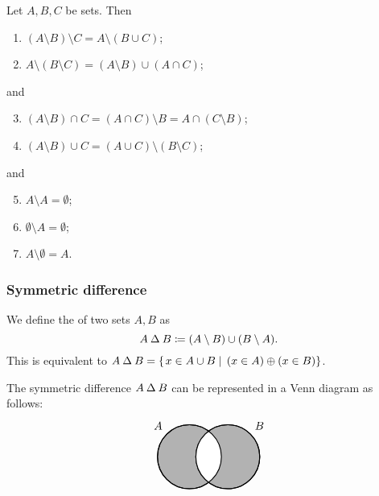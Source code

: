 \begin{lemma} \label{lemma:differenceProperties}
Let $A,B,C$ be sets. Then
\begin{enumerate}
\item $(A\setminus B)\setminus C = A\setminus (B\cup C)$;
\item $A\setminus (B\setminus C) = (A\setminus B) \cup (A\cap C)$;
\end{enumerate}
and
\begin{enumerate} \setcounter{enumi}{2}
\item $(A\setminus B)\cap C = (A\cap C)\setminus B = A\cap (C\setminus B)$;
\item $(A\setminus B)\cup C = (A\cup C)\setminus (B\setminus C)$;
\end{enumerate}
and
\begin{enumerate} \setcounter{enumi}{4}
\item $A\setminus A = \emptyset$;
\item $\emptyset\setminus A = \emptyset$;
\item $A\setminus \emptyset = A$.
\end{enumerate}
\end{lemma}

\subsubsection{Symmetric difference}
\begin{definition}
We define the  of two sets $A,B$ as
\[ A \mathbin{\Delta} B \coloneqq (A\setminus B)\cup(B\setminus A). \]
This is equivalent to $A\mathbin{\Delta} B = \left\{\left. x\in A\cup B \;\right|\; (x\in A)\oplus (x\in B) \right\}$.
\end{definition}

The symmetric difference $A\mathbin{\Delta} B$ can be represented in a Venn diagram as follows:
\[ \begin{tikzpicture}[thick,
    set/.style = {circle,
        minimum size = 2cm}]

\node[set,draw,fill=black!30,label={135:$A$}] (A) at (0,0) {};

\node[set,draw,fill=black!30,label={45:$B$}] (B) at (1.2,0) {};

\begin{scope}
    \clip (0,0) circle(1cm);
    \clip (1.2,0) circle(1cm);
    \fill[white](0,0) circle(1cm);
\end{scope}

\draw (0,0) circle(1cm);
\draw (1.2,0) circle(1cm);
\end{tikzpicture} \]

